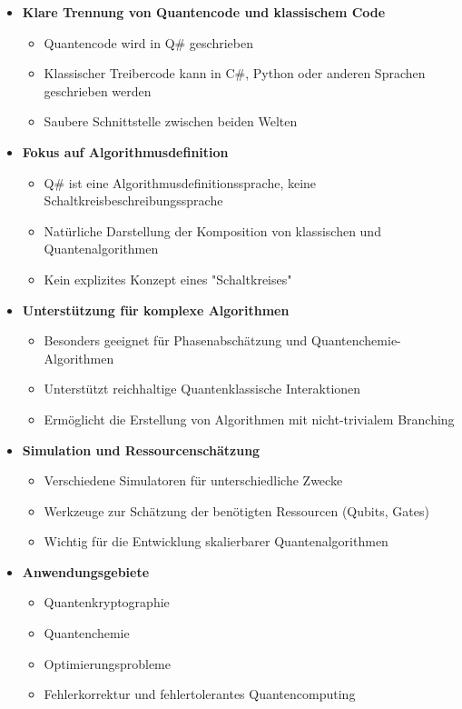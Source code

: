 \begin{itemize}
    \item \textbf{Klare Trennung von Quantencode und klassischem Code}
    \begin{itemize}
        \item Quantencode wird in Q\# geschrieben
        \item Klassischer Treibercode kann in C\#, Python oder anderen Sprachen geschrieben werden
        \item Saubere Schnittstelle zwischen beiden Welten
    \end{itemize}
    
    \item \textbf{Fokus auf Algorithmusdefinition}
    \begin{itemize}
        \item Q\# ist eine Algorithmusdefinitionssprache, keine Schaltkreisbeschreibungssprache
        \item Natürliche Darstellung der Komposition von klassischen und Quantenalgorithmen
        \item Kein explizites Konzept eines "Schaltkreises"
    \end{itemize}
    
    \item \textbf{Unterstützung für komplexe Algorithmen}
    \begin{itemize}
        \item Besonders geeignet für Phasenabschätzung und Quantenchemie-Algorithmen
        \item Unterstützt reichhaltige Quantenklassische Interaktionen
        \item Ermöglicht die Erstellung von Algorithmen mit nicht-trivialem Branching
    \end{itemize}
    
    \item \textbf{Simulation und Ressourcenschätzung}
    \begin{itemize}
        \item Verschiedene Simulatoren für unterschiedliche Zwecke
        \item Werkzeuge zur Schätzung der benötigten Ressourcen (Qubits, Gates)
        \item Wichtig für die Entwicklung skalierbarer Quantenalgorithmen
    \end{itemize}
    
    \item \textbf{Anwendungsgebiete}
    \begin{itemize}
        \item Quantenkryptographie
        \item Quantenchemie
        \item Optimierungsprobleme
        \item Fehlerkorrektur und fehlertolerantes Quantencomputing
    \end{itemize}
\end{itemize}

